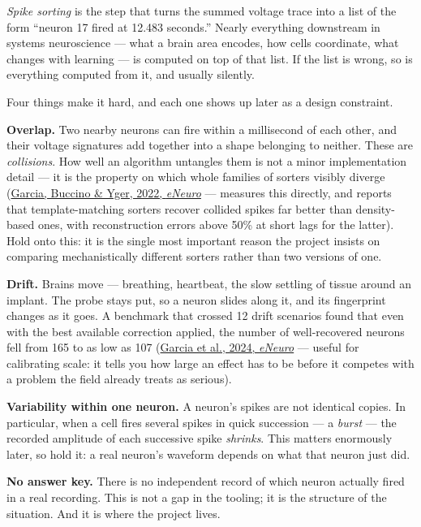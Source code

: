 \documentclass[12pt]{article}
\begin{document}
\emph{Spike sorting} is the step that turns the summed voltage trace into a list of the form
``neuron 17 fired at 12.483 seconds.'' Nearly everything downstream in systems neuroscience
--- what a brain area encodes, how cells coordinate, what changes with learning --- is
computed on top of that list. If the list is wrong, so is everything computed from it, and
usually silently.

Four things make it hard, and each one shows up later as a design constraint.

\textbf{Overlap.} Two nearby neurons can fire within a millisecond of each other, and their
voltage signatures add together into a shape belonging to neither. These are
\emph{collisions}. How well an algorithm untangles them is not a minor implementation
detail --- it is the property on which whole families of sorters visibly diverge
(\href{https://doi.org/10.1523/ENEURO.0105-22.2022}{Garcia, Buccino \& Yger, 2022,
\emph{eNeuro}} --- measures this directly, and reports that template-matching sorters
recover collided spikes far better than density-based ones, with reconstruction errors above
50\% at short lags for the latter). Hold onto this: it is the single most important reason
the project insists on comparing mechanistically different sorters rather than two versions
of one.

\textbf{Drift.} Brains move --- breathing, heartbeat, the slow settling of tissue around an
implant. The probe stays put, so a neuron slides along it, and its fingerprint changes as it
goes. A benchmark that crossed 12 drift scenarios found that even with the best available
correction applied, the number of well-recovered neurons fell from 165 to as low as 107
(\href{https://doi.org/10.1523/ENEURO.0229-23.2023}{Garcia et al., 2024, \emph{eNeuro}} ---
useful for calibrating scale: it tells you how large an effect has to be before it competes
with a problem the field already treats as serious).

\textbf{Variability within one neuron.} A neuron's spikes are not identical copies. In
particular, when a cell fires several spikes in quick succession --- a \emph{burst} --- the
recorded amplitude of each successive spike \emph{shrinks}. This matters enormously later,
so hold it: a real neuron's waveform depends on what that neuron just did.

\textbf{No answer key.} There is no independent record of which neuron actually fired in a
real recording. This is not a gap in the tooling; it is the structure of the situation. And
it is where the project lives.
\end{document}
